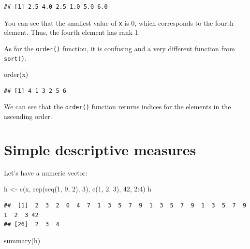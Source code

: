 \documentclass[
]{book}
\newenvironment{Shaded}{\begin{snugshade}}{\end{snugshade}}
\newcommand{\DecValTok}[1]{\textcolor[rgb]{0.00,0.00,0.81}{#1}}
\newcommand{\FunctionTok}[1]{\textcolor[rgb]{0.00,0.00,0.00}{#1}}
\newcommand{\NormalTok}[1]{#1}
\newcommand{\OtherTok}[1]{\textcolor[rgb]{0.56,0.35,0.01}{#1}}
\newcommand{\SpecialCharTok}[1]{\textcolor[rgb]{0.00,0.00,0.00}{#1}}
\theoremstyle{definition}
\theoremstyle{definition}
\theoremstyle{definition}
\theoremstyle{definition}
\theoremstyle{remark}
\begin{document}
\begin{verbatim}
## [1] 2.5 4.0 2.5 1.0 5.0 6.0
\end{verbatim}

You can see that the smallest value of \texttt{x} is 0, which corresponds to the fourth element. Thus, the fourth element has rank 1.

As for the \texttt{order()} function, it is confusing and a very different function from \texttt{sort()}.

\begin{Shaded}
\begin{Highlighting}[]
\FunctionTok{order}\NormalTok{(x)}
\end{Highlighting}
\end{Shaded}

\begin{verbatim}
## [1] 4 1 3 2 5 6
\end{verbatim}

We can see that the \texttt{order()} function returns indices for the elements in the ascending order.

\hypertarget{simple-descriptive-measures}{%
\section{Simple descriptive measures}\label{simple-descriptive-measures}}

Let's have a numeric vector:

\begin{Shaded}
\begin{Highlighting}[]
\NormalTok{h }\OtherTok{\textless{}{-}} \FunctionTok{c}\NormalTok{(x, }\FunctionTok{rep}\NormalTok{(}\FunctionTok{seq}\NormalTok{(}\DecValTok{1}\NormalTok{, }\DecValTok{9}\NormalTok{, }\DecValTok{2}\NormalTok{), }\DecValTok{3}\NormalTok{), }\FunctionTok{c}\NormalTok{(}\DecValTok{1}\NormalTok{, }\DecValTok{2}\NormalTok{, }\DecValTok{3}\NormalTok{), }\DecValTok{42}\NormalTok{, }\DecValTok{2}\SpecialCharTok{:}\DecValTok{4}\NormalTok{)}
\NormalTok{h}
\end{Highlighting}
\end{Shaded}

\begin{verbatim}
##  [1]  2  3  2  0  4  7  1  3  5  7  9  1  3  5  7  9  1  3  5  7  9  1  2  3 42
## [26]  2  3  4
\end{verbatim}

\begin{Shaded}
\begin{Highlighting}[]
\FunctionTok{summary}\NormalTok{(h)}
\end{Highlighting}
\end{Shaded}
\end{document}
